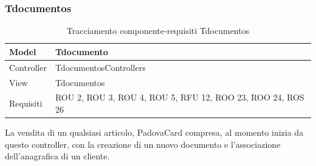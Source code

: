\subsubsection{Tdocumentos}\label{tdocumentos}
\def\arraystretch{2}
\begin{table}[H]
\centering
\begin{tabular}{|l|l|}
\hline
Model & Tdocumento \\ \hline
Controller & TdocumentosControllers \\ \hline
View & Tdocumentos \\ \hline
Requisiti & ROU 2, ROU 3, ROU 4, ROU 5, RFU 12, ROO 23, ROO 24, ROS 26 \\ \hline
\end{tabular}
\caption{Tracciamento componente-requisiti Tdocumentos}
\end{table}

\begin{table}[H]
\centering
{}
\caption{Controller:TdocumentosController}
\end{table}


La vendita di un qualsiasi articolo, PadovaCard compresa, al momento inizia da questo controller, con la creazione di un nuovo documento e l'associazione dell'anagrafica di un cliente. \\

